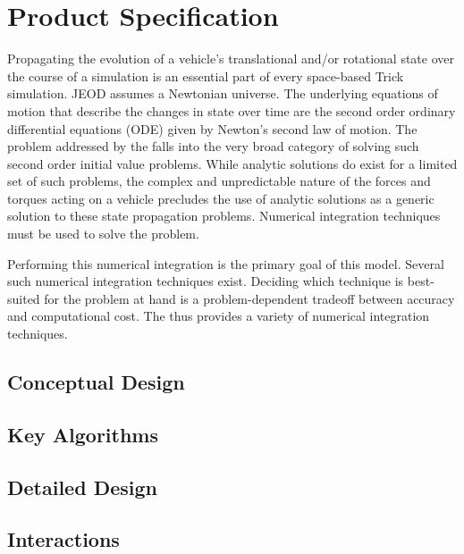 \chapter{Product Specification}\label{ch:spec}
Propagating the evolution of a vehicle's translational and/or rotational 
state over the course of a simulation is an essential part of every 
space-based Trick simulation. JEOD assumes a Newtonian universe.
The underlying equations of motion that
describe the changes in state over time are the second order
ordinary differential equations (ODE) given by Newton's second law of motion.
The problem addressed by the \ModelDesc falls into the very broad category of
solving such second order initial value problems.
While analytic solutions do exist for a limited set of such problems,
the complex and unpredictable nature of the forces and torques acting on a
vehicle precludes the use of analytic solutions as a generic solution
to these state propagation problems. Numerical integration techniques
must be used to solve the problem.

Performing this numerical integration is the primary goal of this model.
Several such numerical integration techniques exist. Deciding which technique
is best-suited for the problem at hand is a problem-dependent tradeoff
between accuracy and computational cost. The \ModelDesc thus provides a
variety of numerical integration techniques.

\section{Conceptual Design}


\section{Key Algorithms}\label{sec:algorithms}


\section{Detailed Design}\label{sec:detailed_design}


\section {Interactions}


\boilerplateinventory
